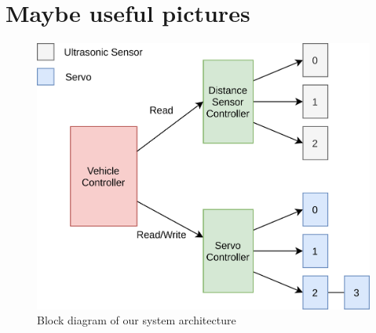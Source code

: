 \documentclass{article}
\begin{document}
\newpage
\section{Maybe useful pictures}


\begin{figure}[H]
	\centering
	\includegraphics[width=\linewidth]{system-architecture.png}
	\caption{Block diagram of our system architecture}
	\label{SystemArchBlock}
\end{figure}
\end{document}
